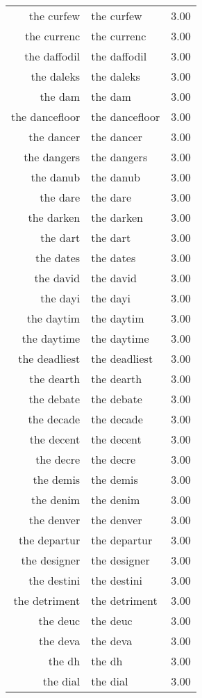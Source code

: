 \begin{table}[ht]
\begin{tabular}{rlr}
  the curfew & the curfew & 3.00 \\ 
  the currenc & the currenc & 3.00 \\ 
  the daffodil & the daffodil & 3.00 \\ 
  the daleks & the daleks & 3.00 \\ 
  the dam & the dam & 3.00 \\ 
  the dancefloor & the dancefloor & 3.00 \\ 
  the dancer & the dancer & 3.00 \\ 
  the dangers & the dangers & 3.00 \\ 
  the danub & the danub & 3.00 \\ 
  the dare & the dare & 3.00 \\ 
  the darken & the darken & 3.00 \\ 
  the dart & the dart & 3.00 \\ 
  the dates & the dates & 3.00 \\ 
  the david & the david & 3.00 \\ 
  the dayi & the dayi & 3.00 \\ 
  the daytim & the daytim & 3.00 \\ 
  the daytime & the daytime & 3.00 \\ 
  the deadliest & the deadliest & 3.00 \\ 
  the dearth & the dearth & 3.00 \\ 
  the debate & the debate & 3.00 \\ 
  the decade & the decade & 3.00 \\ 
  the decent & the decent & 3.00 \\ 
  the decre & the decre & 3.00 \\ 
  the demis & the demis & 3.00 \\ 
  the denim & the denim & 3.00 \\ 
  the denver & the denver & 3.00 \\ 
  the departur & the departur & 3.00 \\ 
  the designer & the designer & 3.00 \\ 
  the destini & the destini & 3.00 \\ 
  the detriment & the detriment & 3.00 \\ 
  the deuc & the deuc & 3.00 \\ 
  the deva & the deva & 3.00 \\ 
  the dh & the dh & 3.00 \\ 
  the dial & the dial & 3.00 \\ 

\end{tabular}
\end{table}
